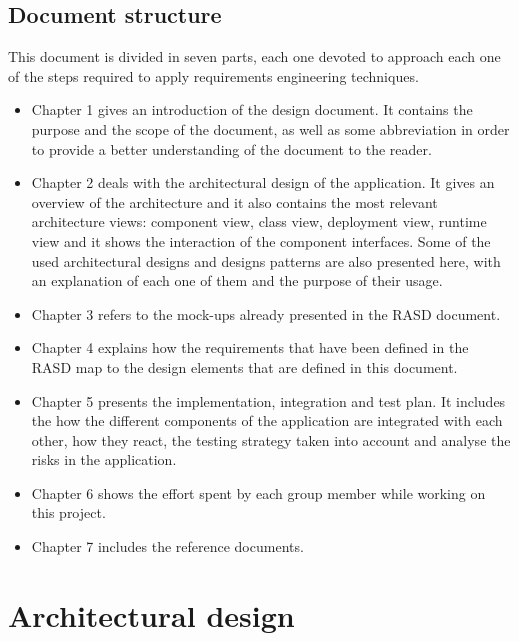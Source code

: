 \documentclass[a4paper, hidelinks, 12pt]{report}
\begin{document}
	\section{Document structure}
	This document is divided in seven parts, each one devoted to approach each one of the steps required to apply requirements engineering techniques.
	\begin{itemize}
		\item Chapter 1 gives an introduction of the design document. It contains the purpose and the scope of the document, as well as some abbreviation in order to provide a better understanding of the document to the reader.
		\item Chapter 2  deals with the architectural design of the application. It gives an overview of the architecture
and it also contains the most relevant architecture views: component view, class view, deployment view, runtime view and it shows the interaction of the component interfaces. Some of the used architectural designs and designs patterns are also presented here, with an explanation of each one of them and the purpose of their usage.

		\item Chapter 3  refers to the mock-ups already presented in the RASD document.
		\item Chapter 4 explains how the requirements that have been defined in the RASD map to the design elements that are defined in this document.
		\item Chapter 5 presents the implementation, integration and test plan. It includes the how the different components of the application are integrated with each other, how they react, the testing strategy taken into account and analyse the risks in the application.
		\item Chapter 6 shows the effort spent by each group member while working on this project.
		\item Chapter 7 includes the reference documents.
	\end{itemize}
	
	\chapter{Architectural design}
	
\end{document}
